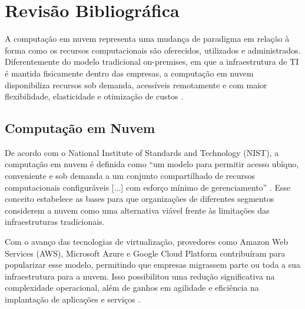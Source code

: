 %
%
%


\chapter{Revisão Bibliográfica}
\label{sec:revbib}

A computação em nuvem representa uma mudança de paradigma em relação à forma como os recursos computacionais são oferecidos, utilizados e administrados. Diferentemente do modelo tradicional on-premises, em que a infraestrutura de TI é mantida fisicamente dentro das empresas, a computação em nuvem disponibiliza recursos sob demanda, acessíveis remotamente e com maior flexibilidade, elasticidade e otimização de custos \cite{nist2011}.

\section{Computação em Nuvem}
De acordo com o National Institute of Standards and Technology (NIST), a computação em nuvem é definida como “um modelo para permitir acesso ubíquo, conveniente e sob demanda a um conjunto compartilhado de recursos computacionais configuráveis [...] com esforço mínimo de gerenciamento” \cite{nist2011}. Esse conceito estabelece as bases para que organizações de diferentes segmentos considerem a nuvem como uma alternativa viável frente às limitações das infraestruturas tradicionais.

Com o avanço das tecnologias de virtualização, provedores como Amazon Web Services (AWS), Microsoft Azure e Google Cloud Platform contribuíram para popularizar esse modelo, permitindo que empresas migrassem parte ou toda a sua infraestrutura para a nuvem. Isso possibilitou uma redução significativa na complexidade operacional, além de ganhos em agilidade e eficiência na implantação de aplicações e serviços \cite{googlecloud2024}.

